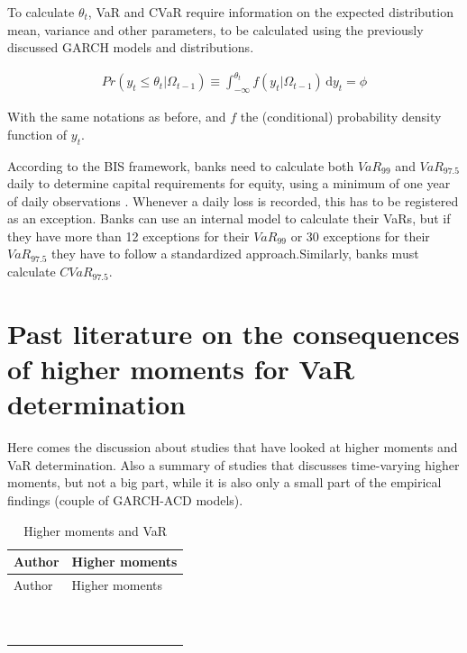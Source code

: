 \documentclass[a4paper, twoside]{templates/ociamthesis}
\begin{document}
To calculate \(\theta_t\), VaR and CVaR require information on the expected distribution mean, variance and other parameters, to be calculated using the previously discussed GARCH models and distributions.

\begin{align}
Pr(y_t \le \theta_t | \Omega_{t-1}) \equiv \int_{-\infty}^{\theta_t} \! f(y_t | \Omega_{t-1}) \, \mathrm{d}y_t = \phi
 \label{eq:eq23}
\end{align}

With the same notations as before, and \(f\) the (conditional) probability density function of \(y_t\).

According to the BIS framework, banks need to calculate both \(VaR_{99}\) and \(VaR_{97.5}\) daily to determine capital requirements for equity, using a minimum of one year of daily observations \autocite{baselcommitteeonbankingsupervision2016}. Whenever a daily loss is recorded, this has to be registered as an exception. Banks can use an internal model to calculate their VaRs, but if they have more than 12 exceptions for their \(VaR_{99}\) or 30 exceptions for their \(VaR_{97.5}\) they have to follow a standardized approach.Similarly, banks must calculate \(CVaR_{97.5}\).

\hypertarget{past-lit}{%
\section{Past literature on the consequences of higher moments for VaR determination}\label{past-lit}}

Here comes the discussion about studies that have looked at higher moments and VaR determination. Also a summary of studies that discusses time-varying higher moments, but not a big part, while it is also only a small part of the empirical findings (couple of GARCH-ACD models).

\begin{longtable}[]{@{}ll@{}}
\caption{Higher moments and VaR}\tabularnewline
\toprule
Author & Higher moments\tabularnewline
\midrule
\endfirsthead
\toprule
Author & Higher moments\tabularnewline
\midrule
\endhead
\textcite{hansen1994} &\tabularnewline
\textbackslash@harvey1999 &\tabularnewline
&\tabularnewline
&\tabularnewline
&\tabularnewline
&\tabularnewline
&\tabularnewline
\textcite{brooks2005} &\tabularnewline
&\tabularnewline
&\tabularnewline
\bottomrule
\end{longtable}
\end{document}
